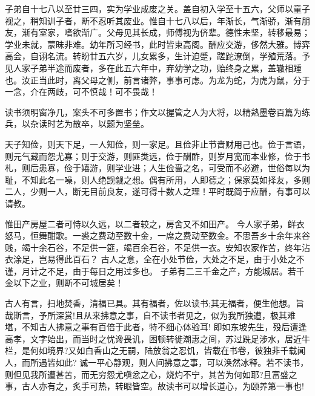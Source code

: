 \documentclass[letterpaper,12pt,english]{sphinxmanual}
\begin{document}
子弟自十七八以至廿三四，实为学业成废之关。盖自初入学至十五六，父师以童子视之，稍知训子者，断不忍听其废业。惟自十七八以后，年渐长，气渐骄，渐有朋友，渐有室家，嗜欲渐广。父母见其长成，师傅视为侪辈。德性未坚，转移最易；学业未就，蒙昧非难。幼年所习经书，此时皆束高阁。酬应交游，侈然大雅。博弈高会，自诩名流。转盼廿五六岁，儿女累多，生计迫蹙，蹉跎潦倒，学殖荒落。予见人家子弟半途而废者，多在此五六年中，弃幼学之功，贻终身之累，盖辙相踵也。汝正当此时，离父母之侧，前言诸弊，事事可虑。为龙为蛇，为虎为鼠，分于一念，介在两歧，可不慎哉！可不畏哉！

读书须明窗净几，案头不可多置书；作文以握管之人为大将，以精熟墨卷百篇为练兵，以杂读时艺为散卒，以题为坚垒。

天子知俭，则天下足，一人知俭，则一家足。且俭非止节啬财用己也。俭于言语，则元气藏而怨尤寡；则于交游，则匪类远，俭于酬酢，则岁月宽而本业修，俭于书札，则后患寡，俭于嬉游，则学业进；人生俭啬之名，可受而不必避，世俗每以为耻，不知此名一噪，则人绝觊觎之想。偶有所用，人即德之；保家莫如择友，多则二人，少则一人，断无目前良友，遂可得十数人之理！平时既简于应酬，有事可以请教。

惟田产房屋二者可恃以久远，以二者较之，房舍又不如田产。
今人家子弟，鲜衣怒马，恒舞酣歌。一裘之费动至数十金，一席之费动至数金。不思吾乡十余年来谷贱，竭十余石谷，不足供一筵，竭百余石谷，不足供一衣。安知农家作苦，终年沾衣涂足，岂易得此百石？
古人之意，全在小处节俭，大处之不足，由于小处之不谨，月计之不足，由于每日之用过多也。
子弟有二三千金之产，方能城居。若千金以下之业，则断不可城居矣！

古人有言，扫地焚香，清福已具。其有福者，佐以读书;其无福者，便生他想。旨哉斯言，予所深赏!且从来拂意之事，自不读书者见之，似为我所独遭，极其难堪，不知古人拂意之事有百倍于此者，特不细心体验耳! 即如东坡先生，殁后遭逢高孝，文字始出，而当时之忧谗畏讥，困顿转徙潮惠之间，苏过跣足涉水，居近牛栏，是何如境界?又如白香山之无嗣，陆放翁之忍饥，皆载在书卷，彼独非千载闻人，而所遇皆如此? 诚一平心静观，则人间拂意之事，可以涣然冰释。若不读书，则但见我所遭甚苦，而无穷怨尤嗔忿之心，烧灼不宁，其苦为何如耶?且富盛之事，古人亦有之，炙手可热，转眼皆空。故读书可以增长道心，为颐养第一事也!
\end{document}
